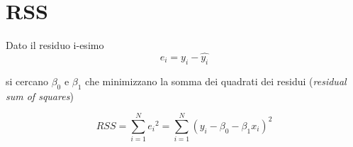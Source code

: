 \section{RSS}
\label{rss}

Dato il residuo i-esimo
\begin{equation}
e_i = y_i - \hat{y_i}
\end{equation}

si cercano ${\beta}_0$ e ${\beta}_1$ che minimizzano la somma dei quadrati dei residui (\textit{residual sum of squares})

\begin{equation}
RSS =  \sum_{i=1}^N {e_i}^2 = \sum_{i=1}^N (y_i - {\beta}_0 - {\beta_1}x_i)^2
\end{equation}